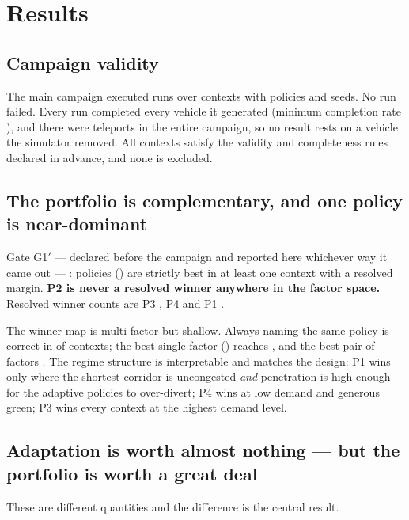 \section{Results}

\subsection{Campaign validity}

The main campaign executed \NumRuns{} runs over \NumContexts{} contexts with
\NumPolicies{} policies and \NumSeeds{} seeds. No run failed. Every run
completed every vehicle it generated (minimum completion rate
\NumMinCompletion{}), and there were \NumTeleports{} teleports in the entire
campaign, so no result rests on a vehicle the simulator removed. All
\NumContextsAnalysed{} contexts satisfy the validity and completeness rules
declared in advance, and none is excluded.

\subsection{The portfolio is complementary, and one policy is near-dominant}

Gate G1$'$ --- declared before the campaign and reported here whichever way it
came out --- \NumGOneVerdict{}: \NumGOneNPolicies{} policies
(\NumGOnePolicies) are strictly best in at least one context with a resolved
margin. \textbf{P2 is never a resolved winner anywhere in the factor space.}
Resolved winner counts are P3 \NumWinResPThree{}, P4 \NumWinResPFour{} and P1
\NumWinResPOne{}.

The winner map is multi-factor but shallow. Always naming the same policy is
correct in \NumWinMapConst{} of contexts; the best single factor
(\NumWinMapOneFactor) reaches \NumWinMapOne{}, and the best pair of factors
\NumWinMapTwo{}. The regime structure is interpretable and matches the design:
P1 wins only where the shortest corridor is uncongested \emph{and} penetration
is high enough for the adaptive policies to over-divert; P4 wins at low demand
and generous green; P3 wins every context at the highest demand level.

\subsection{Adaptation is worth almost nothing --- but the portfolio is worth a
great deal}

These are different quantities and the difference is the central result.

